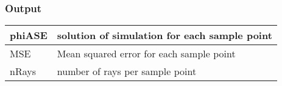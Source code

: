 \begin{flushleft}
\subsubsection{Output}
\begin{supertabular}{| p{3cm} | p{4cm} |}
  \hline
  phiASE & solution of simulation for each sample point \\\hline
  MSE & Mean squared error for each sample point \\\hline
  nRays & number of rays per sample point \\\hline
\end{supertabular}
\end{flushleft}

